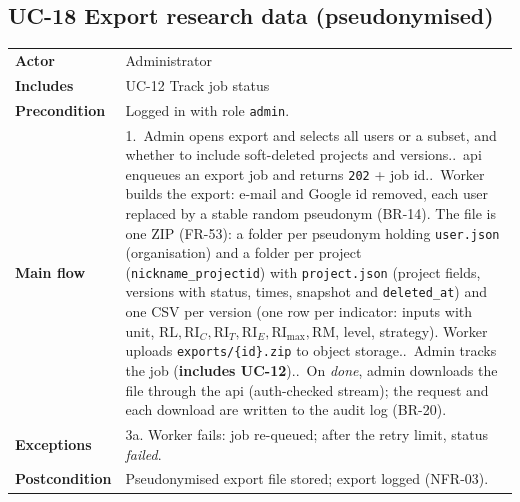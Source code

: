 \documentclass[11pt,a4paper]{article}
\newcommand{\RL}{\mathrm{RL}}
\newcommand{\RIC}{\mathrm{RI}_{C}}
\newcommand{\RIT}{\mathrm{RI}_{T}}
\newcommand{\RIE}{\mathrm{RI}_{E}}
\newcommand{\RImax}{\mathrm{RI}_{\max}}
\newcommand{\RM}{\mathrm{RM}}
\begin{document}
\noindent\begin{minipage}{\linewidth}
\subsection*{UC-18 Export research data (pseudonymised)}
\begin{tabularx}{\linewidth}{@{}>{\raggedright\leavevmode\bfseries\color{creBlue}}p{2.6cm} Y@{}}
\toprule
Actor & Administrator \\
Includes & UC-12 Track job status \\
Precondition & Logged in with role \texttt{admin}. \\
Main flow & 1.~Admin opens export and selects all users or a subset, and whether to include soft-deleted projects and versions..~api enqueues an export job and returns \texttt{202} + job id..~Worker builds the export: e-mail and Google id removed, each user replaced by a stable random pseudonym (BR-14). The file is one ZIP (FR-53): a folder per pseudonym holding \texttt{user.json} (organisation) and a folder per project (\texttt{nickname\_projectid}) with \texttt{project.json} (project fields, versions with status, times, snapshot and \texttt{deleted\_at}) and one CSV per version (one row per indicator: inputs with unit, $\RL,\RIC,\RIT,\RIE,\RImax,\RM$, level, strategy). Worker uploads \texttt{exports/\{id\}.zip} to object storage..~Admin tracks the job (\textbf{includes UC-12})..~On \emph{done}, admin downloads the file through the api (auth-checked stream); the request and each download are written to the audit log (BR-20). \\
Exceptions & 3a. Worker fails: job re-queued; after the retry limit, status \emph{failed}. \\
Postcondition & Pseudonymised export file stored; export logged (NFR-03). \\
\bottomrule
\end{tabularx}
\end{minipage}
\par\medskip
\end{document}

